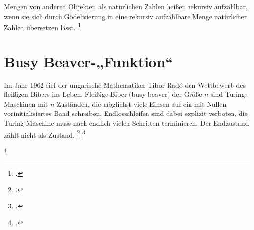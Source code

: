 \documentclass{bschlangaul-theorie}
\begin{document}
Mengen von anderen Objekten als natürlichen Zahlen heißen rekursiv
aufzählbar, wenn sie sich durch Gödelisierung in eine rekursiv
aufzählbare Menge natürlicher Zahlen übersetzen lässt.
\footcite{wiki:rekursiv-aufzaehlbar}

%

\section{Busy Beaver-„Funktion“}

Im Jahr 1962 rief der ungarische Mathematiker Tibor Radó den Wettbewerb
des ﬂeißigen Bibers ins Leben. Fleißige Biber (busy beaver) der Größe
$n$ sind Turing-Maschinen mit $n$ Zuständen, die möglichst viele Einsen
auf ein mit Nullen vorinitialisiertes Band schreiben. Endlosschleifen
sind dabei explizit verboten, \dh die Turing-Maschine muss nach endlich
vielen Schritten terminieren. Der Endzustand zählt nicht als Zustand.
\footcite[Seite 337]{hoffmann}
\footcite{wiki:busy-beaver}

\footcite[Seite 26]{theo:fs:4}
\literatur
\end{document}
